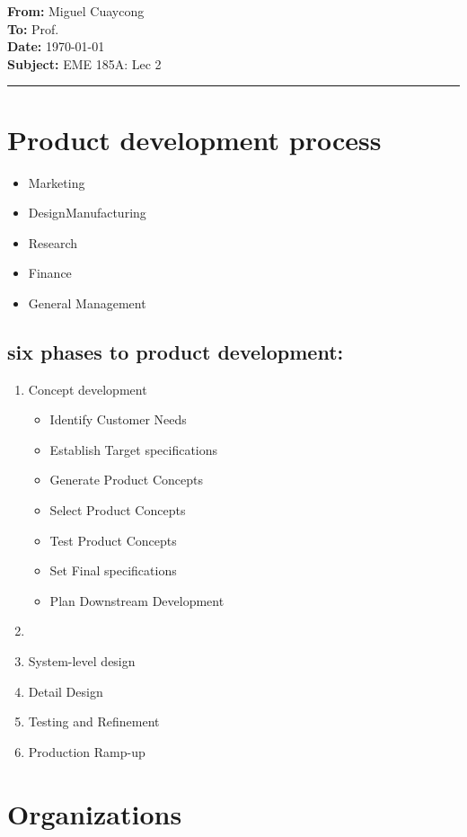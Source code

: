 \documentclass[11pt]{article}
\newcommand{\memoheader}[4]{
  \noindent
  \textbf{From:} #2\\ 
  \textbf{To:} #1\\
  \textbf{Date:} #3\\
  \textbf{Subject:} #4\\[1ex]\hrule\vspace{1.5ex}
}
\begin{document}
\memoheader{Prof. }
            {Miguel Cuaycong}
            {\today}
            {EME 185A: Lec 2}
\section*{Product development process}
\begin{itemize}
    \item Marketing
    \item DesignManufacturing
    \item Research
    \item Finance
    \item General Management
\end{itemize}

\subsection*{six phases to product development:}
\begin{enumerate}
    \item Concept development
    \begin{itemize}
        \item Identify Customer Needs
        \item Establish Target specifications
        \item Generate Product Concepts
        \item Select Product Concepts
        \item Test Product Concepts
        \item Set Final specifications
        \item Plan Downstream Development
    \end{itemize}
    \item 
    \item System-level design
    \item Detail Design
    \item Testing and Refinement
    \item Production Ramp-up
\end{enumerate}
\section*{Organizations}
\end{document}
